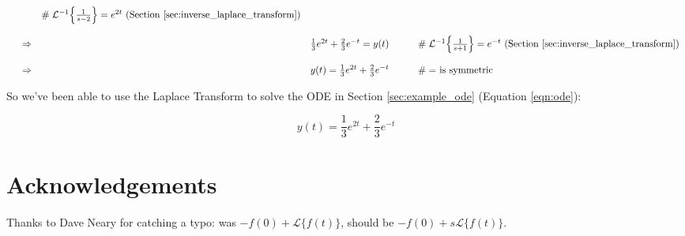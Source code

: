 \documentclass{article}
\theoremstyle{definition}
\begin{document}
\begin{equation*}
\begin{array}{lllll}
                                                                                                                   &\qquad \mathrel{\#} \text{$\mathcal{L}^{-1} \Big \{ \frac{1}{s-2} \Big \} = e^{2t}$ (Section \ref{sec:inverse_laplace_transform})}  \\
[15pt]
&\Rightarrow& \frac{1}{3} e^{2t} + \frac{2}{3} e^{-t} = y(t)                          &\qquad \mathrel{\#} \text{$\mathcal{L}^{-1} \Big \{ \frac{1}{s+1} \Big \} = e^{-t}$ (Section \ref{sec:inverse_laplace_transform})}  \\
[15pt]
&\Rightarrow& y(t) = \frac{1}{3} e^{2t} + \frac{2}{3} e^{-t}                          &\qquad \mathrel{\#} \text{$=$ is symmetric}
\end{array}
\end{equation*}


\bigskip
\noindent
So we've been able to use the Laplace Transform to solve the ODE in Section \ref{sec:example_ode} (Equation \ref{eqn:ode}):

\bigskip
\begin{equation*}
y(t) = \frac{1}{3} e^{2t} + \frac{2}{3} e^{-t}   
\end{equation*}




\bigskip
\section*{Acknowledgements}
Thanks to Dave Neary for catching a typo: was $-f(0) + \mathcal{L}\{f(t)\}$, should be $-f(0) + s \mathcal{L}\{f(t)\} $.

\newpage


\end{document}
